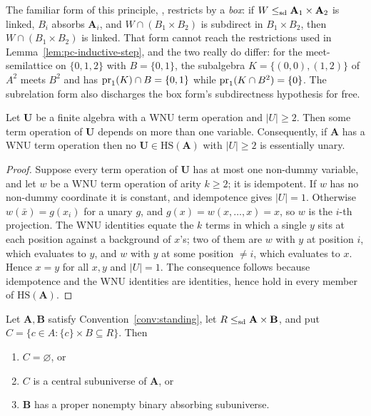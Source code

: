 \begin{hazard}\label{haz:box-vs-sub}
The familiar form of this principle, \cite[Prop.~2.15(i)]{BartoKozik},
restricts by a \emph{box}: if $W\le_{\mathrm{sd}}\mathbf A_{1}\times\mathbf A_{2}$ is
linked, $B_{i}$ absorbs $\mathbf A_{i}$, and $W\cap(B_{1}\times B_{2})$ is
subdirect in $B_{1}\times B_{2}$, then $W\cap(B_{1}\times B_{2})$ is linked.
That form cannot reach the restrictions used in
Lemma~\ref{lem:pc-inductive-step}, and the two really do differ: for the
meet-semilattice on $\{0,1,2\}$ with $B=\{0,1\}$, the subalgebra
$K=\{(0,0),(1,2)\}$ of $A^{2}$ meets $B^{2}$ and has
$\operatorname*{pr}_{1}(K)\cap B=\{0,1\}$ while $\operatorname*{pr}_{1}(K\cap B^{2})=\{0\}$. The
subrelation form also discharges the box form's subdirectness hypothesis for
free.
\end{hazard}

\begin{lemma}\label{lem:no-unary-quotient}
Let $\mathbf U$ be a finite algebra with a WNU term operation and $|U|\ge2$.
Then some term operation of $\mathbf U$ depends on more than one variable.
Consequently, if $\mathbf A$ has a WNU term operation then no
$\mathbf U\in\mathrm{HS}(\mathbf A)$ with $|U|\ge2$ is essentially unary.
\end{lemma}

\begin{proof}
Suppose every term operation of $\mathbf U$ has at most one non-dummy variable,
and let $w$ be a WNU term operation of arity $k\ge2$; it is idempotent. If $w$
has no non-dummy coordinate it is constant, and idempotence gives $|U|=1$.
Otherwise $w(\bar x)=g(x_{i})$ for a unary $g$, and $g(x)=w(x,\dots,x)=x$, so
$w$ is the $i$-th projection. The WNU identities equate the $k$ terms in which
a single $y$ sits at each position against a background of $x$'s; two of them
are $w$ with $y$ at position $i$, which evaluates to $y$, and $w$ with $y$ at
some position $\neq i$, which evaluates to $x$. Hence $x=y$ for all $x,y$ and
$|U|=1$. The consequence follows because idempotence and the WNU identities are
identities, hence hold in every member of $\mathrm{HS}(\mathbf A)$.
\end{proof}

\begin{longlemma}\label{lem:central-relation}
Let $\mathbf A,\mathbf B$ satisfy Convention~\ref{conv:standing},
let $R\le_{\mathrm{sd}}\mathbf A\times\mathbf B$, and put
$C=\{c\in A:\{c\}\times B\subseteq R\}$. Then
\begin{enumerate}\alphlabels\tightlist
\item $C=\varnothing$, or
\item $C$ is a central subuniverse of $\mathbf A$, or
\item $\mathbf B$ has a proper nonempty binary absorbing subuniverse.
\end{enumerate}
\end{longlemma}

